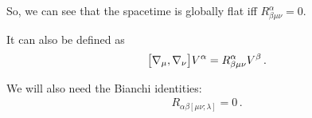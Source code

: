 \documentclass[main.tex]{subfiles}
\begin{document}
So, we can see that the spacetime is globally flat iff \(R^{\alpha }_{\beta \mu \nu } = 0\). 

It can also be defined as 
%
\begin{align}
\qty[\nabla_\mu, \nabla_\nu ] V^{\alpha } = R^{\alpha }_{\beta \mu \nu } V^{\beta }
\,.
\end{align}

We will also need the Bianchi identities: 
%
\begin{align}
R_{\alpha \beta [ \mu \nu ; \lambda ]} = 0
\,.
\end{align}
\end{document}
